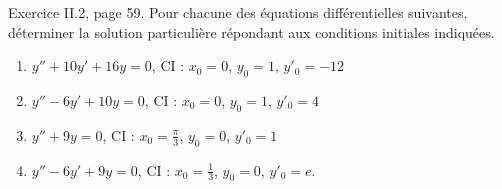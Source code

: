 \begin{exercice}\label{exoEquaDiff0011}

Exercice II.2, page 59. Pour chacune des équations différentielles suivantes, déterminer la solution particulière répondant aux conditions initiales indiquées.
\begin{enumerate}

\item
$y''+10y'+16y=0$, CI : $x_0=0$, $y_0=1$, $y'_0=-12$
\item
$y''-6y'+10y=0$, CI : $x_0=0$, $y_0=1$, $y'_0=4$
\item
$y''+9y=0$, CI : $x_0=\frac{ \pi }{ 3 }$, $y_0=0$, $y'_0=1$
\item
$y''-6y'+9y=0$, CI : $x_0=\frac{ 1 }{ 3 }$, $y_0=0$, $y'_0=e$.
\end{enumerate}


\end{exercice}
